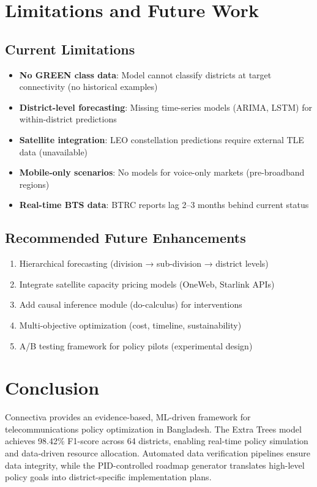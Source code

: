 \documentclass[11pt,a4paper]{article}
\begin{document}
\section{Limitations and Future Work}

\subsection{Current Limitations}

\begin{itemize}
  \item \textbf{No GREEN class data}: Model cannot classify districts at target connectivity (no historical examples)
  \item \textbf{District-level forecasting}: Missing time-series models (ARIMA, LSTM) for within-district predictions
  \item \textbf{Satellite integration}: LEO constellation predictions require external TLE data (unavailable)
  \item \textbf{Mobile-only scenarios}: No models for voice-only markets (pre-broadband regions)
  \item \textbf{Real-time BTS data}: BTRC reports lag 2–3 months behind current status
\end{itemize}

\subsection{Recommended Future Enhancements}

\begin{enumerate}
  \item Hierarchical forecasting (division → sub-division → district levels)
  \item Integrate satellite capacity pricing models (OneWeb, Starlink APIs)
  \item Add causal inference module (do-calculus) for interventions
  \item Multi-objective optimization (cost, timeline, sustainability)
  \item A/B testing framework for policy pilots (experimental design)
\end{enumerate}

\section{Conclusion}

Connectiva provides an evidence-based, ML-driven framework for telecommunications policy optimization in Bangladesh. The Extra Trees model achieves 98.42\% F1-score across 64 districts, enabling real-time policy simulation and data-driven resource allocation. Automated data verification pipelines ensure data integrity, while the PID-controlled roadmap generator translates high-level policy goals into district-specific implementation plans.
\end{document}
